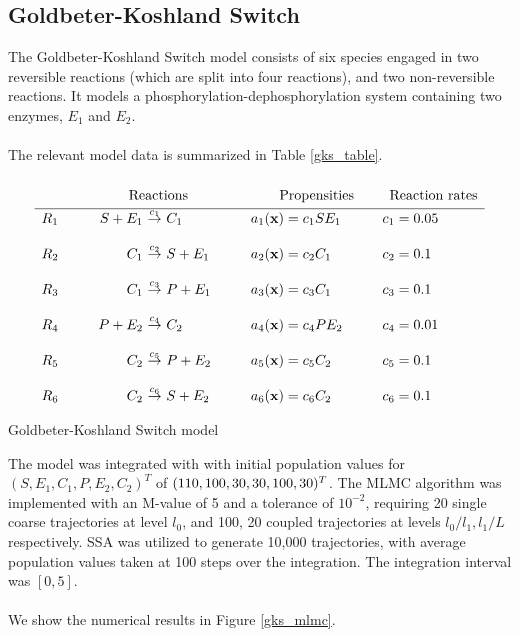 \documentclass[ugrad,lot,lof,openright,11pt,oneside,onehalfspace]{RUthesis}
\begin{document}
		\subsection{Goldbeter-Koshland Switch}

			The Goldbeter-Koshland Switch model \cite{chem_phys_models} consists of six species engaged in two reversible reactions (which are split into four reactions), and two non-reversible reactions. It models a phosphorylation-dephosphorylation system containing two enzymes, $E_1$ and $E_2$.\\
			\\
			The relevant model data is summarized in Table \ref{gks_table}.

			\begin{table}[H]
			\[
			\begin{array}{l@{\hspace*{10mm}}r@{\ }c@{\ }l@{\hspace*{10mm}}l@{\hspace*{10mm}}l}
			\multicolumn{4}{c}{\text{{\huge\phantom{$I_{I_I}$}}Reactions}} & \multicolumn{1}{c}{\text{Propensities}} & \multicolumn{1}{c}{\text{Reaction rates}}\\
			\hline
			R_1 	& S + E_1 & \stackrel{c_1}{\rightarrow} & C_1 	& a_1(\mathbf{x}) = c_1 S E_1 	& c_1 = 0.05
			\\\\
			R_2 	& C_1 & \stackrel{c_2}{\rightarrow} & S + E_1  	& a_2(\mathbf{x}) = c_2 C_1		& c_2 = 0.1
			\\\\
			R_3 	& C_1 & \stackrel{c_3}{\rightarrow} & P + E_1 	& a_3(\mathbf{x}) = c_3 C_1		& c_3 = 0.1
			\\\\
			R_4 	& P + E_2 & \stackrel{c_4}{\rightarrow} & C_2 	& a_4(\mathbf{x}) = c_4 P E_2	& c_4 = 0.01
			\\\\
			R_5 	& C_2 & \stackrel{c_5}{\rightarrow} & P + E_2 	& a_5(\mathbf{x}) = c_5 C_2		& c_5 = 0.1
			\\\\
			R_6 	& C_2 & \stackrel{c_6}{\rightarrow} & S + E_2 	& a_6(\mathbf{x}) = c_6 C_2		& c_6 = 0.1
			\end{array}
			\]
			\captionsetup{width=0.8\textwidth}
			\caption{Goldbeter-Koshland Switch model}
			\label{gks_table}
			\end{table}

			\noindent
			The model was integrated with with initial population values for $(S,E_1,C_1,P,E_2,C_2)^T$ of $(110,100,30,\\30,100,30)^T$. The MLMC algorithm was implemented with an M-value of 5 and a tolerance of $10^{-2}$, requiring 20 single coarse trajectories at level $l_0$, and 100, 20 coupled trajectories at levels $l_0/l_1,l_1/L$ respectively. SSA was utilized to generate 10,000 trajectories, with average population values taken at 100 steps over the integration. The integration interval was $[0,5]$.\\
			\\
			We show the numerical results in Figure \ref{gks_mlmc}.
\end{document}
